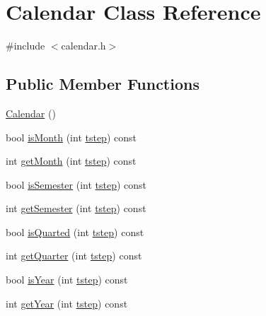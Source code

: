 \hypertarget{class_calendar}{}\section{Calendar Class Reference}
\label{class_calendar}


{\ttfamily \#include $<$calendar.\+h$>$}

\subsection*{Public Member Functions}
\begin{DoxyCompactItemize}
\item 
\mbox{\hyperlink{class_calendar_a423ef27351bfa2309c6e2173bff61756}{Calendar}} ()
\item 
bool \mbox{\hyperlink{class_calendar_aef73bffd20f144396d1b034cc59748f7}{is\+Month}} (int \mbox{\hyperlink{thread__vessels_8cpp_a84bc73d278de929ec9974e1a95d9b23a}{tstep}}) const
\item 
int \mbox{\hyperlink{class_calendar_ab2adf2d50dd3fc91b2922355a6fa7458}{get\+Month}} (int \mbox{\hyperlink{thread__vessels_8cpp_a84bc73d278de929ec9974e1a95d9b23a}{tstep}}) const
\item 
bool \mbox{\hyperlink{class_calendar_a00bdd3de7bdf3bf73dacd58935d64f17}{is\+Semester}} (int \mbox{\hyperlink{thread__vessels_8cpp_a84bc73d278de929ec9974e1a95d9b23a}{tstep}}) const
\item 
int \mbox{\hyperlink{class_calendar_ae4c06d85353108756445bcb277d6149d}{get\+Semester}} (int \mbox{\hyperlink{thread__vessels_8cpp_a84bc73d278de929ec9974e1a95d9b23a}{tstep}}) const
\item 
bool \mbox{\hyperlink{class_calendar_ab1078f34e8b23ab76f641ce33a433dbc}{is\+Quarted}} (int \mbox{\hyperlink{thread__vessels_8cpp_a84bc73d278de929ec9974e1a95d9b23a}{tstep}}) const
\item 
int \mbox{\hyperlink{class_calendar_a36b36e50a81115f6c4cac1b65b5174bb}{get\+Quarter}} (int \mbox{\hyperlink{thread__vessels_8cpp_a84bc73d278de929ec9974e1a95d9b23a}{tstep}}) const
\item 
bool \mbox{\hyperlink{class_calendar_a8fb49de65297953dfe0eb7d6b71f7071}{is\+Year}} (int \mbox{\hyperlink{thread__vessels_8cpp_a84bc73d278de929ec9974e1a95d9b23a}{tstep}}) const
\item 
int \mbox{\hyperlink{class_calendar_afb1819b26af464c2b5219e62a65d79e8}{get\+Year}} (int \mbox{\hyperlink{thread__vessels_8cpp_a84bc73d278de929ec9974e1a95d9b23a}{tstep}}) const
\end{DoxyCompactItemize}
